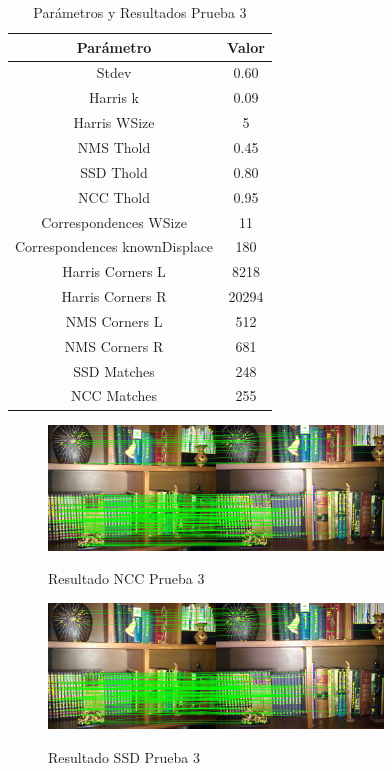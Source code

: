 \documentclass{IEEEtran}
\begin{document}
\begin{table}[H]
\centering
\begin{tabular}{*2c}
\toprule
Parámetro & Valor \\ 
\midrule
Stdev & 0.60 \\
Harris k & 0.09 \\
Harris WSize & 5 \\
NMS Thold & 0.45 \\
SSD Thold & 0.80 \\
NCC Thold & 0.95 \\
Correspondences WSize & 11 \\
Correspondences knownDisplace & 180 \\
\hline
Harris Corners L & 8218 \\
Harris Corners R & 20294 \\
NMS Corners L & 512 \\
NMS Corners R & 681 \\
SSD Matches & 248 \\
NCC Matches & 255 \\
\bottomrule
\end{tabular}
\caption{Parámetros y Resultados Prueba 3}
\label{tb:test3}
\end{table}

\begin{figure}[H]
\caption{Resultado NCC Prueba 3}
\centering
\includegraphics[width=8.9cm,natwidth=1200,natheight=450]{figs/img3ncc.png}
\label{fig:test3ncc}
\end{figure}

\begin{figure}[H]
\caption{Resultado SSD Prueba 3}
\centering
\includegraphics[width=8.9cm,natwidth=1200,natheight=450]{figs/img3ssd.png}
\label{fig:test3ssd}
\end{figure}



\end{document}
